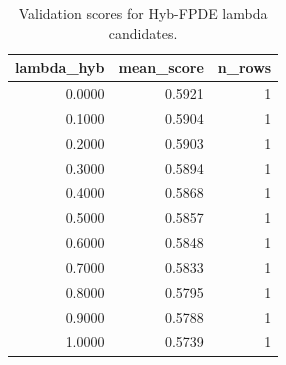 \begin{table}[t]
\caption{Validation scores for Hyb-FPDE lambda candidates.}
\label{tab:lambda_distribution_computed}
\centering
\begin{tabular}{rrr}
\toprule
lambda\_hyb & mean\_score & n\_rows \\
\midrule
0.0000 & 0.5921 & 1 \\
0.1000 & 0.5904 & 1 \\
0.2000 & 0.5903 & 1 \\
0.3000 & 0.5894 & 1 \\
0.4000 & 0.5868 & 1 \\
0.5000 & 0.5857 & 1 \\
0.6000 & 0.5848 & 1 \\
0.7000 & 0.5833 & 1 \\
0.8000 & 0.5795 & 1 \\
0.9000 & 0.5788 & 1 \\
1.0000 & 0.5739 & 1 \\
\bottomrule
\end{tabular}

\end{table}
